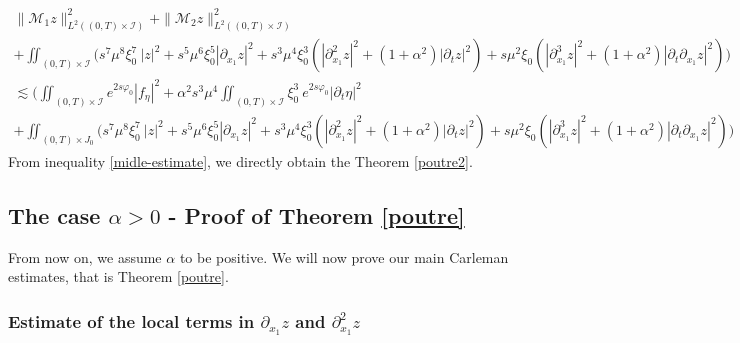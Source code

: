 \documentclass[a4paper, 12pt]{article}
\theoremstyle{plain}
\theoremstyle{definition}
\numberwithin{theorem}{section}
\numberwithin{equation}{section}
\begin{document}
{\begin{multline}\label{midle-estimate}
\|\mathcal{M}_1z\|^2_{L^2((0,T)\times\mathcal{I})}+\|\mathcal{M}_2z\|^2_{L^2((0,T)\times\mathcal{I})}\\
+ \iint_{(0,T)\times\mathcal{I}}\Big(s^7\mu^8\xi^7_0~|z|^2+s^5\mu^6\xi_0^5|\partial_{x_1}z|^2+s^3\mu^4\xi_0^3(|\partial^2_{x_1}z|^2+(1+\alpha^2)|\partial_tz|^2)  +s\mu^2\xi_0(|\partial^3_{x_1}z|^2+(1+\alpha^2)|\partial_t\partial_{x_1}z|^2)\Big)\\
\lesssim \Big(\iint_{(0,T)\times\mathcal{I}}e^{2s\varphi_0}|f_\eta|^2+\alpha^2s^3\mu^4\iint_{(0,T)\times\mathcal{I}}\xi_0^3~e^{2s\varphi_0}|\partial_t \eta|^2\\
+\iint_{(0,T)\times J_0}\Big(s^7\mu^8\xi^7_0~|z|^2+s^5\mu^6\xi_0^5|\partial_{x_1}z|^2+s^3\mu^4\xi_0^3(|\partial^2_{x_1}z|^2+(1+\alpha^2)|\partial_tz|^2)+s\mu^2\xi_0(|\partial^3_{x_1}z|^2+(1+\alpha^2)|\partial_t\partial_{x_1}z|^2)\Big)
\end{multline}
From inequality \eqref{midle-estimate}, we directly obtain the Theorem \ref{poutre2}.
\subsection{The case \texorpdfstring{$\alpha > 0$ } -- Proof of Theorem \ref{poutre}}\label{Sect3}
From now on, we assume $\alpha$ to be positive. We will now prove our main Carleman estimates, that is Theorem \ref{poutre}.
\subsubsection{Estimate of the local terms in \texorpdfstring{$\partial_{x_1}z$}{der1} and \texorpdfstring{$\partial_{x_1}^2z$}{der2}}\label{SectLocalTerm1}

}
\end{document}
